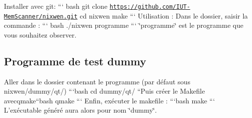 Installer avec git\-: ``` bash git clone \href{https://github.com/IUT-MemScanner/nixwen.git}{\tt https\-://github.\-com/\-I\-U\-T-\/\-Mem\-Scanner/nixwen.\-git} cd nixwen make ``` Utilisation \-: Dans le dossier, saisir la commande \-: ``` bash ./nixwen programme ``` \char`\"{}programme\char`\"{} est le programme que vous souhaitez observer.

\subsection*{Programme de test {\ttfamily dummy}}

Aller dans le dossier contenant le programme (par défaut sous {\ttfamily nixwen/dummy/qt/}) ```bash cd dummy/qt/ ``{\ttfamily  Puis créer le Makefile avec}qmake{\ttfamily  }``bash qmake ``` Enfin, exécuter le makefile \-: ```bash make ``` L'exécutable généré aura alors pour nom \char`\"{}dummy\char`\"{}. 